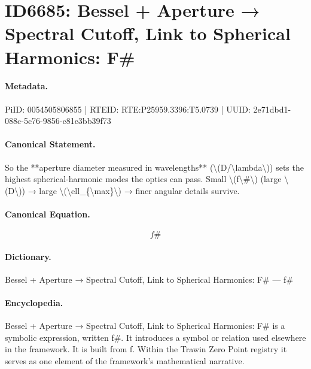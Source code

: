 \section*{ID6685: Bessel + Aperture → Spectral Cutoff, Link to Spherical Harmonics: F\#}
\paragraph{Metadata.}
PiID: 0054505806855 | RTEID: RTE:P25959.3396:T5.0739 | UUID: 2e71dbd1-088c-5c76-9856-c81e3bb39f73

\paragraph{Canonical Statement.}
So the **aperture diameter measured in wavelengths** (\textbackslash{}(D/\textbackslash{}lambda\textbackslash{})) sets the highest spherical-harmonic modes the optics can pass. Small \textbackslash{}(f\textbackslash{}\#\textbackslash{}) (large \textbackslash{}(D\textbackslash{})) → large \textbackslash{}(\textbackslash{}ell\_\{\textbackslash{}max\}\textbackslash{}) → finer angular details survive.

\paragraph{Canonical Equation.}
\[
f\#
\]

\paragraph{Dictionary.}
Bessel + Aperture → Spectral Cutoff, Link to Spherical Harmonics: F\# — f\#

\paragraph{Encyclopedia.}
Bessel + Aperture → Spectral Cutoff, Link to Spherical Harmonics: F\# is a symbolic expression, written f\#. It introduces a symbol or relation used elsewhere in the framework. It is built from f. Within the Trawin Zero Point registry it serves as one element of the framework's mathematical narrative.
